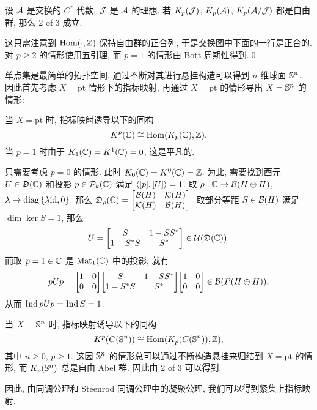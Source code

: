 \begin{Proposition}
	设 $ \CA $ 是交换的 $ C^* $ 代数, $ \CJ $ 是 $ \CA $ 的理想. 若 $ K_p(\CJ) $, $ K_p(\CA) $, $ K_p(\CA/\CJ) $ 都是自由群, 那么 2 of 3 成立.
\end{Proposition}
\begin{Proof}
	这只需注意到 $ \Hom(\cdot,\Z) $ 保持自由群的正合列, 于是交换图中下面的一行是正合的. 对 $ p\geqslant 2 $ 的情形使用五引理, 而 $ p=1 $ 的情形由 Bott 周期性得到.\qed
\end{Proof}

单点集是最简单的拓扑空间, 通过不断对其进行悬挂构造可以得到 $ n $ 维球面 $ \S^n $. 因此首先考虑 $ X=\mathrm{pt} $ 情形下的指标映射, 再通过 $ X=\mathrm{pt} $ 的情形导出 $ X=\S^n $ 的情形:

\begin{Example}
	当 $ X=\mathrm{pt} $ 时, 指标映射诱导以下的同构
	\[
		K^p(\C)\cong \Hom(K_p(\C),\Z).
	\]
	当 $ p=1 $ 时由于 $ K_1(\C)=K^1(\C)=0 $, 这是平凡的.
	
	只需要考虑 $ p=0 $ 的情形. 此时 $ K_0(\C)=K^0(\C)=\Z $. 为此, 需要找到酉元 $ U\in\FD(\C) $ 和投影 $ p\in\CP_k(\C) $ 满足 $ \lrangle{[p],[U]}=1 $. 取 $ \rho : \C\to\CB(H\oplus H) $, $ \lambda\mapsto\diag\set{\lambda\id,0} $. 那么 $ \FD_{\rho}(\C)=\mqty[\CB(H) & \CK(H) \\ \CK(H) & \CB(H)] $. 取部分等距 $ S\in\CB(H) $ 满足 $ \dim\ker S=1 $, 那么
	\[
		U=\mqty[S & 1-SS^* \\ 1-S^*S & S^*]\in\CU(\FD(\C)).
	\]
	而取 $ p=1\in\C $ 是 $ \Mat_1(\C) $ 中的投影, 就有
	\[
		pUp=\mqty[1 & 0 \\ 0 & 0]\mqty[S & 1-SS^* \\ 1-S^*S & S^*]\mqty[1 & 0 \\ 0 & 0]\in\CB(P(H\oplus H)),
	\]
	从而 $ \Ind pUp=\Ind S=1 $.
\end{Example}

\begin{Example}
	当 $ X=\S^n $ 时, 指标映射诱导以下的同构
	\[
		K^p(C(\S^n))\cong\Hom(K_p(C(\S^n)),\Z),
	\]
	其中 $ n\geqslant 0 $, $ p\geqslant 1 $. 这因 $ \S^n $ 的情形总可以通过不断构造悬挂来归结到 $ X=\mathrm{pt} $ 的情形, 而 $ K_p(\S^n) $ 总是自由 Abel 群. 因此由 2 of 3 可以得到.
\end{Example}

因此, 由同调公理和 Steenrod 同调公理中的凝聚公理, 我们可以得到紧集上指标映射.

